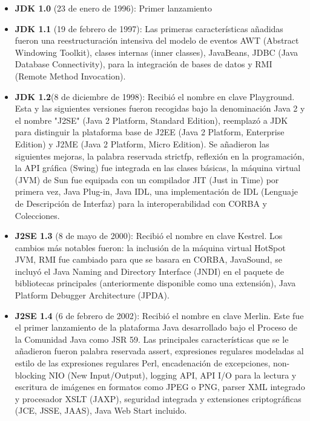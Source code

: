 \begin{itemize}

	\item \textbf{JDK 1.0} (23 de enero de 1996): Primer lanzamiento
	
	\item \textbf{JDK 1.1} (19 de febrero de 1997): Las primeras características añadidas fueron una reestructuración intensiva del modelo de eventos AWT (Abstract Windowing Toolkit), clases internas (inner classes), JavaBeans, JDBC (Java Database Connectivity), para la integración de bases de datos y RMI (Remote Method Invocation).
	
     \item \textbf{JDK 1.2}(8 de diciembre de 1998): Recibió el nombre en clave Playground. Esta y las siguientes versiones fueron recogidas bajo la denominación Java 2 y el nombre "J2SE" (Java 2 Platform, Standard Edition), reemplazó a JDK para distinguir la plataforma base de J2EE (Java 2 Platform, Enterprise Edition) y J2ME (Java 2 Platform, Micro Edition). 
    Se añadieron las siguientes mejoras, la palabra reservada strictfp, reflexión en la programación, la API gráfica (Swing) fue integrada en las clases básicas, la máquina virtual (JVM) de Sun fue equipada con un compilador JIT (Just in Time) por primera vez, Java Plug-in, Java IDL, una implementación de IDL (Lenguaje de Descripción de Interfaz) para la interoperabilidad con CORBA y Colecciones.

    \item \textbf{J2SE 1.3} (8 de mayo de 2000): Recibió el nombre en clave Kestrel. Los cambios más notables fueron: la inclusión de la máquina virtual HotSpot JVM, RMI fue cambiado para que se basara en CORBA, JavaSound, se incluyó el Java Naming and Directory Interface (JNDI) en el paquete de bibliotecas principales (anteriormente disponible como una extensión), Java Platform Debugger Architecture (JPDA).

    \item \textbf{J2SE 1.4} (6 de febrero de 2002): Recibió el nombre en clave Merlin. Este fue el primer lanzamiento de la plataforma Java desarrollado bajo el Proceso de la Comunidad Java como JSR 59. Las principales características que se le añadieron fueron palabra reservada assert, expresiones regulares modeladas al estilo de las expresiones regulares Perl, encadenación de excepciones, non-blocking NIO (New Input/Output), logging API, API I/O para la lectura y escritura de imágenes en formatos como JPEG o PNG, parser XML integrado y procesador XSLT (JAXP), seguridad integrada y extensiones criptográficas (JCE, JSSE, JAAS), Java Web Start incluido.
    

\end{itemize}
